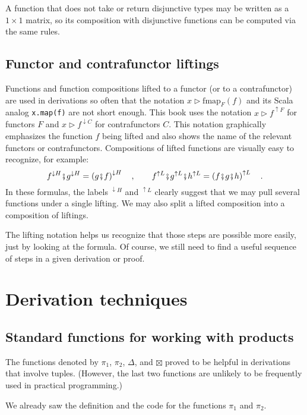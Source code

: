 A function that does not take or return disjunctive types may be written
as a $1\times1$ matrix, so its composition with disjunctive functions
can be computed via the same rules. 

\subsection{Functor and contrafunctor liftings}

Functions and function compositions lifted to a functor (or to a contrafunctor)
are used in derivations so often that the notation $x\triangleright\text{fmap}_{F}(f)$
and its Scala analog \lstinline!x.map(f)! are not short enough. This
book uses the notation $x\triangleright f^{\uparrow F}$ for functors
$F$ and $x\triangleright f^{\downarrow C}$ for contrafunctors $C$.
This notation graphically emphasizes the function $f$ being lifted
and also shows the name of the relevant functors or contrafunctors.
Compositions of lifted functions are visually easy to recognize, for
example:
\[
f^{\downarrow H}\bef g^{\downarrow H}=\left(g\bef f\right)^{\downarrow H}\quad,\quad\quad f^{\uparrow L}\bef g^{\uparrow L}\bef h^{\uparrow L}=\left(f\bef g\bef h\right)^{\uparrow L}\quad.
\]
In these formulas, the labels $^{\downarrow H}$ and $^{\uparrow L}$
clearly suggest that we may pull several functions under a single
lifting. We may also split a lifted composition into a composition
of liftings. 

The lifting notation helps us recognize that those steps are possible
more easily, just by looking at the formula. Of course, we still need
to find a useful sequence of steps in a given derivation or proof.

\section{Derivation techniques}

\subsection{Standard functions for working with products}

The functions denoted by $\pi_{1}$, $\pi_{2}$, $\Delta$, and $\boxtimes$
proved to be helpful in derivations that involve tuples. (However,
the last two functions are unlikely to be frequently used in practical
programming.) 

We already saw the definition and the code for the functions $\pi_{1}$
and $\pi_{2}$. 

